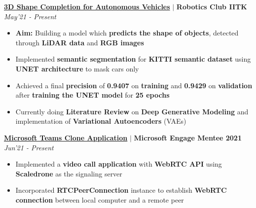 \documentclass[9pt]{extarticle}
\begin{document}
\hspace{-2mm}\textbf{\href{https://github.com/Lakshita2002/3D-Shape-Completion-for-Autonomous-Vehicles}{3D Shape Completion for Autonomous Vehicles}} $|$ \textbf{Robotics Club IITK}
\hfill\hfill\textit{May'21 - Present}\\
\vspace{-4mm}

\begin{itemize}
\item  \textbf{Aim:} Building a model which \textbf{predicts the shape of objects}, detected through \textbf{LiDAR data} and \textbf{RGB images} 
\item  Implemented \textbf{semantic segmentation} for \textbf{KITTI semantic dataset} using \textbf{UNET architecture} to mask cars only
\item Achieved a final \textbf{precision} of \textbf{0.9407} on \textbf{training} and \textbf{0.9429} on \textbf{validation} after \textbf{training the UNET model} for \textbf{25 epochs} 
\item Currently doing \textbf{Literature Review} on \textbf{Deep Generative Modeling} and implementation of \textbf{Variational Autoencoders} (VAEs)
\end{itemize}
\vspace{2.5mm}

\hspace{-2mm}\textbf{\href{https://github.com/Lakshita2002/clone}{Microsoft Teams Clone Application}} $|$ \textbf{Microsoft Engage Mentee 2021}
\hfill\hfill\textit{Jun'21 - Present}\\
\vspace{-4mm}
\begin{itemize}
\item  Implemented a \textbf{video call application} with \textbf{WebRTC API} using \textbf{Scaledrone} as the signaling server
\item Incorporated \textbf{RTCPeerConnection} instance to establish \textbf{WebRTC connection} between local computer and a remote peer
\end{itemize}
\vspace{2.5mm}
\end{document}
